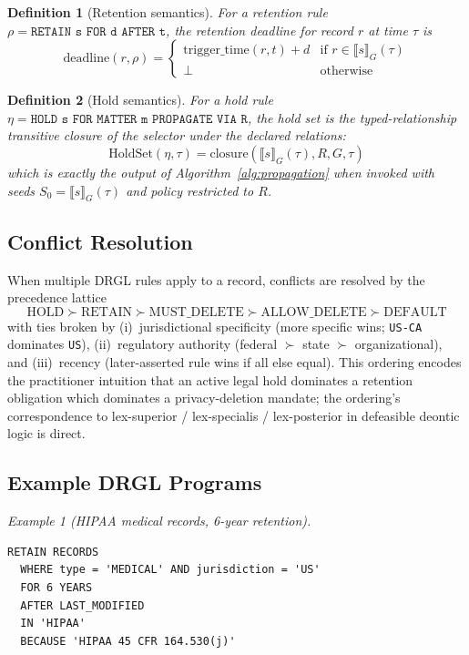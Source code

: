 \documentclass{ieeeaccess}
\newtheorem{definition}{Definition}
\begin{document}
\begin{definition}[Retention semantics]
For a retention rule $\rho = \texttt{RETAIN s FOR d AFTER t}$, the retention deadline for record $r$ at time $\tau$ is
\[
\mathrm{deadline}(r, \rho) =
\begin{cases}
\mathrm{trigger\_time}(r, t) + d & \text{if } r \in \llbracket s \rrbracket_G(\tau) \\
\bot & \text{otherwise}
\end{cases}
\]
\end{definition}

\begin{definition}[Hold semantics]
For a hold rule $\eta = \texttt{HOLD s FOR MATTER m PROPAGATE VIA R}$, the hold set is the typed-relationship transitive closure of the selector under the declared relations:
\[
\mathrm{HoldSet}(\eta, \tau) = \mathrm{closure}(\llbracket s \rrbracket_G(\tau), R, G, \tau)
\]
which is exactly the output of Algorithm~\ref{alg:propagation} when invoked with seeds $S_0 = \llbracket s \rrbracket_G(\tau)$ and policy restricted to $R$.
\end{definition}

\subsection{Conflict Resolution}

When multiple DRGL rules apply to a record, conflicts are resolved by the precedence lattice
\[
\mathrm{HOLD} \succ \mathrm{RETAIN} \succ \mathrm{MUST\_DELETE} \succ \mathrm{ALLOW\_DELETE} \succ \mathrm{DEFAULT}
\]
with ties broken by (i)~jurisdictional specificity (more specific wins; \texttt{US-CA} dominates \texttt{US}), (ii)~regulatory authority (federal $\succ$ state $\succ$ organizational), and (iii)~recency (later-asserted rule wins if all else equal). This ordering encodes the practitioner intuition that an active legal hold dominates a retention obligation which dominates a privacy-deletion mandate; the ordering's correspondence to lex-superior / lex-specialis / lex-posterior in defeasible deontic logic is direct.

\subsection{Example DRGL Programs}

\textit{Example 1 (HIPAA medical records, 6-year retention).}
\begin{lstlisting}[language=drgl,basicstyle=\ttfamily\footnotesize]
RETAIN RECORDS
  WHERE type = 'MEDICAL' AND jurisdiction = 'US'
  FOR 6 YEARS
  AFTER LAST_MODIFIED
  IN 'HIPAA'
  BECAUSE 'HIPAA 45 CFR 164.530(j)'
\end{lstlisting}
\end{document}
